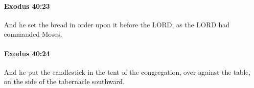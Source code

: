 		\paragraph{Exodus 40:23} %
			\label{EXODUS-40-23}

			And he set the bread in order upon it before the LORD; as the LORD had commanded Moses.


		\paragraph{Exodus 40:24} %
			\label{EXODUS-40-24}

			And he put the candlestick in the tent of the congregation, over against the table, on the side of the tabernacle southward.


